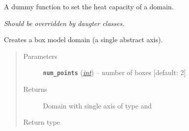 \documentclass[letterpaper,10pt,english]{sphinxmanual}
\begin{document}
\begin{fulllineitems}
\begin{fulllineitems}
\begin{quote}
\begin{description}
\end{description}\end{quote}

\end{fulllineitems}


\begin{fulllineitems}
\label{api/climlab.domain:climlab.domain.domain._Domain.set_heat_capacity}
A dummy function to set the heat capacity of a domain.

\emph{Should be overridden by daugter classes.}

\end{fulllineitems}


\end{fulllineitems}


\begin{fulllineitems}
\label{api/climlab.domain:climlab.domain.domain.box_model_domain}
Creates a box model domain (a single abstract axis).
\begin{quote}\begin{description}
\item[{Parameters}] \leavevmode
\textbf{\texttt{num\_points}} (\href{http://docs.python.org/2.7/library/functions.html\#int}{\emph{int}}) -- number of boxes {[}default: 2{]}

\item[{Returns}] \leavevmode
Domain with single axis of type  
and 

\item[{Return type}] \leavevmode
{\hyperref[api/climlab.domain:climlab.domain.domain._Domain]{\emph{}}}

\end{description}\end{quote}

\end{fulllineitems}

\end{document}
